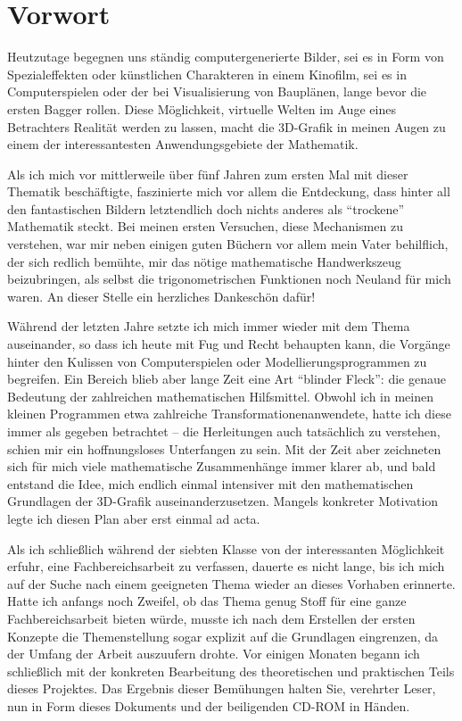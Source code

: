 \chapter*{Vorwort}

Heutzutage begegnen uns ständig computergenerierte Bilder, sei es in Form von Spezialeffekten oder künstlichen Charakteren in einem Kinofilm, sei es in Computerspielen oder der bei Visualisierung von Bauplänen, lange bevor die ersten Bagger rollen. Diese Möglichkeit, virtuelle Welten im Auge eines Betrachters Realität werden zu lassen, macht die 3D-Grafik in meinen Augen zu einem der interessantesten Anwendungsgebiete der Mathematik.

Als ich mich vor mittlerweile über fünf Jahren zum ersten Mal mit dieser Thematik beschäftigte, faszinierte mich vor allem die Entdeckung, dass hinter all den fantastischen Bildern letztendlich doch nichts anderes als \enquote{trockene} Mathematik steckt. Bei meinen ersten Versuchen, diese Mechanismen zu verstehen, war mir neben einigen guten Büchern vor allem mein Vater behilflich, der sich redlich bemühte, mir das nötige mathematische Handwerkszeug beizubringen, als selbst die trigonometrischen Funktionen noch Neuland für mich waren. An dieser Stelle ein herzliches Dankeschön dafür!

Während der letzten Jahre setzte ich mich immer wieder mit dem Thema auseinander, so dass ich heute mit Fug und Recht behaupten kann, die Vorgänge hinter den Kulissen von Computerspielen oder Modellierungsprogrammen zu begreifen. Ein Bereich blieb aber lange Zeit eine Art \enquote{blinder Fleck}: die genaue Bedeutung der zahlreichen mathematischen Hilfsmittel. Obwohl ich in meinen kleinen Programmen etwa zahlreiche Transformationenanwendete, hatte ich diese immer als gegeben betrachtet -- die Herleitungen auch tatsächlich zu verstehen, schien mir ein hoffnungsloses Unterfangen zu sein. Mit der Zeit aber zeichneten sich für mich viele mathematische Zusammenhänge immer klarer ab, und bald entstand die Idee, mich endlich einmal intensiver mit den mathematischen Grundlagen der 3D-Grafik auseinanderzusetzen. Mangels konkreter Motivation legte ich diesen Plan aber erst einmal ad acta.

Als ich schließlich während der siebten Klasse von der interessanten Möglichkeit erfuhr, eine Fachbereichsarbeit zu verfassen, dauerte es nicht lange, bis ich mich auf der Suche nach einem geeigneten Thema wieder an dieses Vorhaben erinnerte. Hatte ich anfangs noch Zweifel, ob das Thema genug Stoff für eine ganze Fachbereichsarbeit bieten würde, musste ich nach dem Erstellen der ersten Konzepte die Themenstellung sogar explizit auf die Grundlagen eingrenzen, da der Umfang der Arbeit auszuufern drohte. Vor einigen Monaten begann ich schließlich mit der konkreten Bearbeitung des theoretischen und praktischen Teils dieses Projektes. Das Ergebnis dieser Bemühungen halten Sie, verehrter Leser, nun in Form dieses Dokuments und der beiligenden CD-ROM in Händen.

